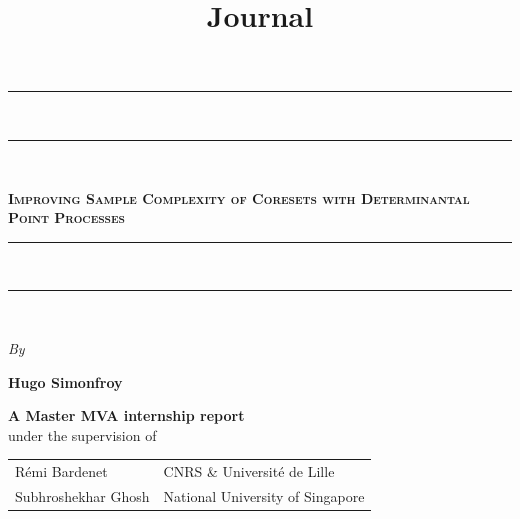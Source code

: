 \documentclass{report} %
\newcommand{\1}{\mathds{1}} %
\theoremstyle{definition} %
\begin{document}
    \title{Journal}

\begin{titlepage}
    \begin{center}
        \vspace*{25pt} {
        \begin{spacing}{0.05}
            \rule{400pt}{2pt}\\
            \rule{400pt}{0.75pt}\\
        \end{spacing}
        \vspace{20pt}
        \begin{spacing}{0.9}
            \fontsize{23.6pt}{26pt}\selectfont%
            \textsc{\textbf{Improving Sample Complexity of Coresets with Determinantal Point Processes}}\\%
        \end{spacing}
        \vspace{5pt}
        \begin{spacing}{0.05}
            \rule{400pt}{0.75pt}\\
            \rule{400pt}{2pt}\\
        \end{spacing}
        }
    
        \vspace*{1cm}
        \begin{large}
        \textit{By}\\%
        \end{large}
    
    
        \vspace*{4pt}
        \begin{Large}
        \textbf{Hugo Simonfroy}\\%
        \end{Large}
    
    \begin{large}
        \vspace*{5cm}
        \textbf{
        A Master MVA internship report }
        \vspace*{6pt}\\
        under the supervision of
        \vspace*{20pt}\\
    
        \begin{longtable*}{ p{0.4\textwidth} p{0.5\textwidth} }
            R\'emi Bardenet & CNRS \& Université de Lille
            \tabularnewline Subhroshekhar Ghosh & National University of Singapore
            \tabularnewline
        \end{longtable*}
    \end{large}
    

\end{center}
\end{titlepage}
\end{document}
